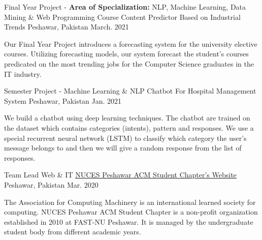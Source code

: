 


\begin{cventries}


\cventry
{Final Year Project - \textbf{Area of Specialization:} NLP, Machine Learning, Data Mining \& Web Programming } %
{Course Content Predictor Based on Industrial Trends } %
{Peshawar, Pakistan} %
{March. 2021} %
{ %
\begin{cvitems}
\item {Our Final Year Project introduces a forecasting system for the university elective courses. Utilizing forecasting models, our system forecast the student’s courses predicated on the most trending jobs for the Computer Science graduates in the IT industry. 
}
\end{cvitems}
}



\cventry
{Semester Project - Machine Learning \& NLP } %
{Chatbot For Hospital Management System } %
{Peshawar, Pakistan} %
{Jan. 2021} %
{ %
\begin{cvitems}
\item {We build a chatbot using deep learning techniques. The chatbot are trained on the dataset which contains categories (intents), pattern and responses. We use a special recurrent neural network (LSTM) to classify which category the user’s message belongs to and then we will give a random response from the list of responses.
}
\end{cvitems}
}


\cventry
{Team Lead Web \& IT} %
{\href{http://pwr.nu.edu.pk/acm/}{NUCES Peshawar ACM Student Chapter's Website}} %
{Peshawar, Pakistan} %
{Mar. 2020} %
{ %
\begin{cvitems}
\item {The Association for Computing Machinery is an international learned society for computing. NUCES Peshawar ACM Student Chapter is a non-profit organization established in 2010 at FAST-NU Peshawar. It is managed by the undergraduate student body from different academic years.}
\end{cvitems}
}


\end{cventries}
